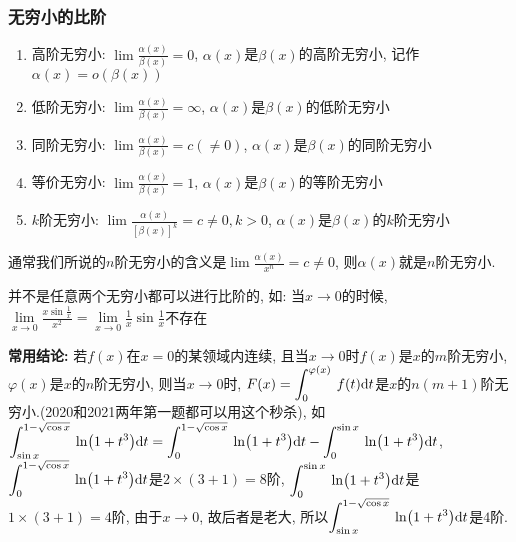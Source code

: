 \subsubsection{无穷小的比阶}\label{无穷小的比阶}
\begin{enumerate}
\item 高阶无穷小: $ \lim\limits \frac{\alpha(x)}{\beta(x)}=0 $, $ \alpha(x) $是$ \beta(x) $的高阶无穷小, 记作$ \alpha(x)=o(\beta(x)) $
\item 低阶无穷小: $ \lim\limits \frac{\alpha(x)}{\beta(x)}=\infty $, $ \alpha(x) $是$ \beta(x) $的低阶无穷小
\item 同阶无穷小: $ \lim\limits \frac{\alpha(x)}{\beta(x)}=c(\neq 0) $, $ \alpha(x) $是$ \beta(x) $的同阶无穷小
\item 等价无穷小: $ \lim\limits \frac{\alpha(x)}{\beta(x)}=1 $, $ \alpha(x) $是$ \beta(x) $的等阶无穷小
\item $ k $阶无穷小: $ \lim\limits \frac{\alpha(x)}{[\beta(x)]^{k}}=c\neq 0, k>0 $, $ \alpha(x) $是$ \beta(x) $的$ k $阶无穷小
\end{enumerate}\par
通常我们所说的$ n $阶无穷小的含义是$ \lim\limits \frac{\alpha(x)}{x^{n}}=c\neq 0 $, 则$ \alpha(x) $就是$ n $阶无穷小.
\begin{tcolorbox}
并不是任意两个无穷小都可以进行比阶的, 如: 当$ x \rightarrow 0 $的时候, $ \lim\limits_{x\rightarrow 0}\frac{x\sin \frac{1}{x}}{x^{2}}=\lim\limits_{x\rightarrow 0}\frac{1}{x}\sin \frac{1}{x} $不存在 \par \vspace{.5em}
\textbf{常用结论: } 若$ f(x) $在$ x=0 $的某领域内连续, 且当$ x\rightarrow 0 $时$ f(x) $是$ x $的$ m $阶无穷小, $ \varphi(x) $是$ x $的$ n $阶无穷小, 则当$ x\rightarrow 0 $时, $ F(x)=\displaystyle\int_{0}^{\varphi(x)}\hspace{.2em}f(t)\mathrm{d}t $是$ x $的$ n(m+1) $阶无穷小.(2020和2021两年第一题都可以用这个秒杀), 如$ \displaystyle\int_{\sin x}^{1-\sqrt{\cos x}}\hspace{.2em}\ln (1+t^{3})\mathrm{d}t=\displaystyle\int_{0}^{1-\sqrt{\cos x}}\hspace{.2em}\ln(1+t^{3})\mathrm{d}t-\displaystyle\int_{0}^{\sin x}\hspace{.2em}\ln(1+t^{3})\mathrm{d}t $, $ \displaystyle\int_{0}^{1-\sqrt{\cos x}}\hspace{.2em}\ln(1+t^{3})\mathrm{d}t $是$ 2\times (3+1)=8 $阶, $ \displaystyle\int_{0}^{\sin x}\hspace{.2em}\ln(1+t^{3})\mathrm{d}t $是$ 1\times(3+1)=4 $阶, 由于$ x\rightarrow 0 $, 故后者是老大, 所以$ \displaystyle\int_{\sin x}^{1-\sqrt{\cos x}}\hspace{.2em}\ln (1+t^{3})\mathrm{d}t $是$ 4 $阶.
\end{tcolorbox}
